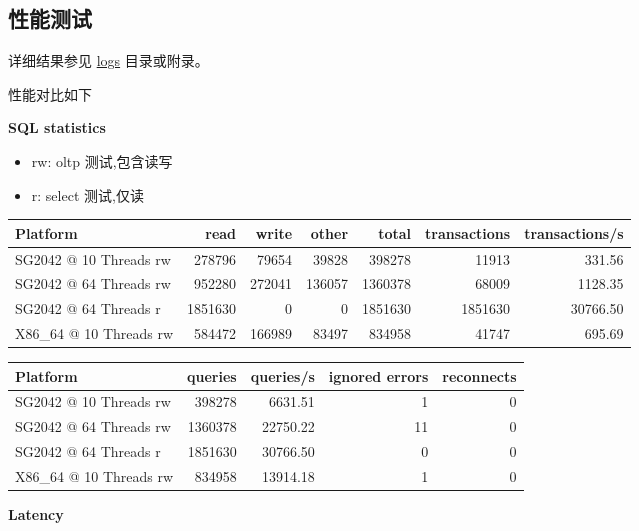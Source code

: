 \documentclass{article}
\begin{document}
\subsection{性能测试}

详细结果参见 \href{https://github.com/QA-Team-lo/dbtest/tree/main/opengauss/logs}{logs} 目录或附录。

性能对比如下

\textbf{SQL statistics}

\begin{itemize}
    \item rw: oltp 测试,包含读写 
    \item r: select 测试,仅读
\end{itemize}

\begin{table}[h]
\centering
\begin{tabular}{|l|r|r|r|r|r|r|}
\hline
Platform & read & write & other & total & transactions & transactions/s \\
\hline
SG2042 @ 10 Threads rw & 278796 & 79654 & 39828 & 398278 & 11913 & 331.56 \\
SG2042 @ 64 Threads rw & 952280 & 272041 & 136057 & 1360378 & 68009 & 1128.35 \\
SG2042 @ 64 Threads r  & 1851630 & 0      & 0      & 1851630 & 1851630 & 30766.50 \\
X86\_64 @ 10 Threads rw & 584472 & 166989 & 83497 & 834958 & 41747 & 695.69 \\
\hline
\end{tabular}
\end{table}

\begin{table}[h]
\centering
\begin{tabular}{|l|r|r|r|r|}
\hline
Platform & queries & queries/s & ignored errors & reconnects \\
\hline
SG2042 @ 10 Threads rw & 398278 & 6631.51 & 1 & 0 \\
SG2042 @ 64 Threads rw & 1360378 & 22750.22 & 11 & 0 \\
SG2042 @ 64 Threads r  & 1851630 & 30766.50 & 0 & 0 \\
X86\_64 @ 10 Threads rw & 834958 & 13914.18 & 1 & 0 \\
\hline
\end{tabular}
\end{table}

\textbf{Latency}
\end{document}
